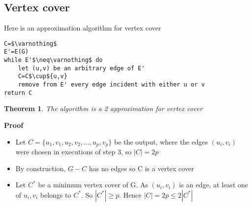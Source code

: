 \documentclass{article}[18pt]
\newtheorem{theorem}{Theorem}
\begin{document}
\subsection{Vertex cover}
Here is an approximation algorithm for vertex cover
\begin{lstlisting}[caption=Approx-Vertex-Cover({G=(V,E)})]
C=$\varnothing$
E'=E(G)
while E'$\neq\varnothing$ do
	let (u,v) be an arbitrary edge of E'
	C=C$\cup${u,v}
	remove from E' every edge incident with either u or v
return C
\end{lstlisting}
\begin{theorem}
	The algorithm is a 2 approximation for vertex cover
\end{theorem}
\textbf{Proof}
\begin{itemize}
	\item Let $C=\{u_1,v_1,u_2,v_2,...,u_p,v_p\}$ be the output, where the edges $(u_i,v_i)$ were chosen in executions of step 3, so $|C|=2p$
	\item By construction, $G-C$ has no edges so C is a vertex cover
	\item Let $C^*$ be a minimum vertex cover of G. As $(u_i,v_i)$ is an edge, at least one of $u_i,v_i$ belongs to $C^*$. So $|C^*|\geqslant p$. Hence $|C|=2p\leqslant 2|C^*|$
\end{itemize}
\end{document}
